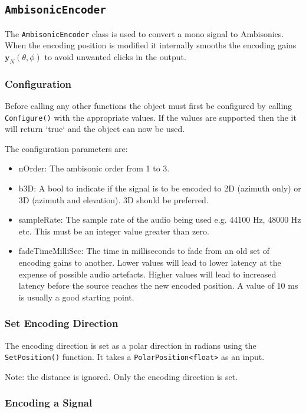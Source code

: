 \documentclass[12pt]{report}
\newcommand{\code}[1]{\texttt{#1}}
\begin{document}
\subsection{\code{AmbisonicEncoder}}

The \code{AmbisonicEncoder} class is used to convert a mono signal to Ambisonics. When the encoding position is modified it internally smooths the encoding gains $\textbf{y}_{N}(\theta,\phi)$ to avoid unwanted clicks in the output.

\subsubsection{Configuration}

Before calling any other functions the object must first be configured by calling \code{Configure()} with the appropriate values. If the values are supported then the it will return `true` and the object can now be used.

The configuration parameters are:
\begin{itemize}
    \item nOrder: The ambisonic order from 1 to 3.
    \item b3D: A bool to indicate if the signal is to be encoded to 2D (azimuth only) or 3D (azimuth and elevation). 3D should be preferred.
    \item sampleRate: The sample rate of the audio being used e.g. 44100 Hz, 48000 Hz etc. This must be an integer value greater than zero.
    \item fadeTimeMilliSec: The time in milliseconds to fade from an old set of encoding gains to another. Lower values will lead to lower latency at the expense of possible audio artefacts. Higher values will lead to increased latency before the source reaches the new encoded position. A value of 10 ms is usually a good starting point.
\end{itemize}

\subsubsection{Set Encoding Direction}

The encoding direction is set as a polar direction in radians using the \code{SetPosition()} function. It takes a \code{PolarPosition<float>} as an input.

Note: the distance is ignored. Only the encoding direction is set.

\subsubsection{Encoding a Signal}
\end{document}
